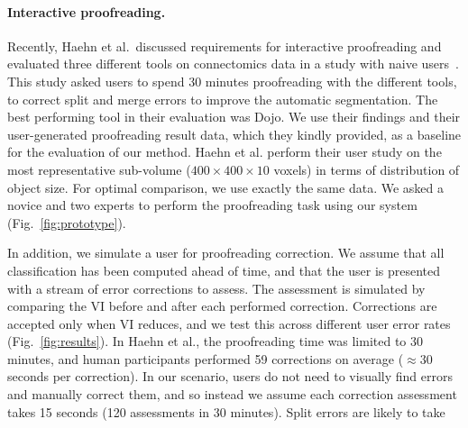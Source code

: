 \paragraph{Interactive proofreading.}
Recently, Haehn et al.~discussed requirements for interactive proofreading and evaluated three different tools on connectomics data in a study with naive users~\cite{haehn_dojo_2014}. This study asked users to spend 30 minutes proofreading with the different tools, to correct split and merge errors to improve the automatic segmentation. The best performing tool in their evaluation was Dojo. We use their findings and their user-generated proofreading result data, which they kindly provided, as a baseline for the evaluation of our method.
Haehn et al. perform their user study on the most representative sub-volume ($400\times400\times10$ voxels) in terms of distribution of object size. For optimal comparison, we use exactly the same data. We asked a novice and two experts to perform the proofreading task using our system (Fig.~\ref{fig:prototype}).

In addition, we simulate a user for proofreading correction. We assume that all classification has been computed ahead of time, and that the user is presented with a stream of error corrections to assess. The assessment is simulated by comparing the VI before and after each performed correction. Corrections are accepted only when VI reduces, and we test this across different user error rates (Fig.~\ref{fig:results}). In Haehn et al., the proofreading time was limited to 30 minutes, and human participants performed 59 corrections on average ($\approx30$ seconds per correction). In our scenario, users do not need to visually find errors and manually correct them, and so instead we assume each correction assessment takes 15 seconds (120 assessments in 30 minutes). Split errors are likely to take 

